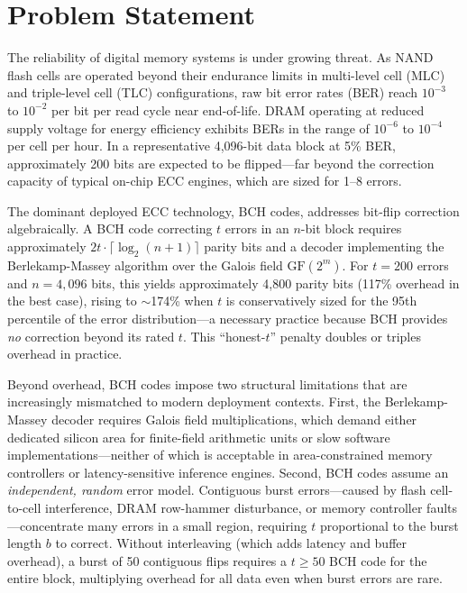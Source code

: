 \chapter*{Problem Statement}
\noindent

The reliability of digital memory systems is under growing threat. As NAND flash cells are operated beyond their endurance limits in multi-level cell (MLC) and triple-level cell (TLC) configurations, raw bit error rates (BER) reach $10^{-3}$ to $10^{-2}$ per bit per read cycle near end-of-life. DRAM operating at reduced supply voltage for energy efficiency exhibits BERs in the range of $10^{-6}$ to $10^{-4}$ per cell per hour. In a representative 4,096-bit data block at 5\% BER, approximately 200 bits are expected to be flipped---far beyond the correction capacity of typical on-chip ECC engines, which are sized for 1--8 errors.

The dominant deployed ECC technology, BCH codes, addresses bit-flip correction algebraically. A BCH code correcting $t$ errors in an $n$-bit block requires approximately $2t \cdot \lceil \log_2(n+1) \rceil$ parity bits and a decoder implementing the Berlekamp-Massey algorithm over the Galois field $\text{GF}(2^m)$. For $t = 200$ errors and $n = 4{,}096$ bits, this yields approximately 4,800 parity bits (117\% overhead in the best case), rising to $\sim$174\% when $t$ is conservatively sized for the 95th percentile of the error distribution---a necessary practice because BCH provides \emph{no} correction beyond its rated $t$. This ``honest-$t$'' penalty doubles or triples overhead in practice.

Beyond overhead, BCH codes impose two structural limitations that are increasingly mismatched to modern deployment contexts. First, the Berlekamp-Massey decoder requires Galois field multiplications, which demand either dedicated silicon area for finite-field arithmetic units or slow software implementations---neither of which is acceptable in area-constrained memory controllers or latency-sensitive inference engines. Second, BCH codes assume an \emph{independent, random} error model. Contiguous burst errors---caused by flash cell-to-cell interference, DRAM row-hammer disturbance, or memory controller faults---concentrate many errors in a small region, requiring $t$ proportional to the burst length $b$ to correct. Without interleaving (which adds latency and buffer overhead), a burst of 50 contiguous flips requires a $t \geq 50$ BCH code for the entire block, multiplying overhead for all data even when burst errors are rare.

